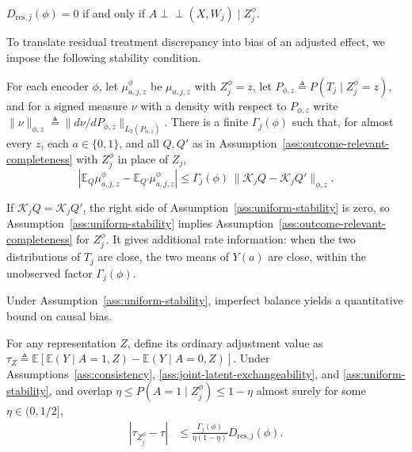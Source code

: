 \begin{proposition}
\label{prop:zero-discrepancy}
	$D_{\mathrm{res},j}(\phi)=0$ if and only if $A\perp\!\!\!\perp(X,W_j)\mid Z_j^\phi$.
\end{proposition}

To translate residual treatment discrepancy into bias of an adjusted effect, we impose the following stability condition.
\begin{assumption}
\label{ass:uniform-stability}
For each encoder $\phi$, let $\mu^\phi_{a,j,z}$ be $\mu_{a,j,z}$ with $Z_j^\phi = z$, let $P_{\phi,z}\triangleq P(T_j\mid Z_j^\phi=z)$, and for a signed measure $\nu$ with a density with respect to $P_{\phi,z}$ write $\|\nu\|_{\phi,z}\triangleq\|d\nu/dP_{\phi,z}\|_{L_2(P_{\phi,z})}$. There is a finite $\Gamma_j(\phi)$ such that, for almost every $z$, each $a\in\{0,1\}$, and all $Q,Q'$ as in Assumption~\ref{ass:outcome-relevant-completeness} with $Z_j^\phi$ in place of $Z_j$,
\[|\mathbb E_Q\mu^\phi_{a,j,z}-\mathbb E_{Q'}\mu^\phi_{a,j,z}|\le\Gamma_j(\phi)\,\|\mathcal K_jQ-\mathcal K_jQ'\|_{\phi,z}.\]
\end{assumption}
 If $\mathcal K_jQ=\mathcal K_jQ'$, the right side of Assumption~\ref{ass:uniform-stability} is zero, so Assumption~\ref{ass:uniform-stability} implies Assumption~\ref{ass:outcome-relevant-completeness} for $Z_j^\phi$. It gives additional rate information: when the two distributions of $T_j$ are close, the two means of $Y(a)$ are close, within the unobserved factor $\Gamma_j(\phi)$.

Under Assumption~\ref{ass:uniform-stability}, imperfect balance yields a quantitative bound on causal bias.

\begin{theorem}
\label{thm:approximate-proxy-bias-bound}
For any representation $Z$, define its ordinary adjustment value as $\tau_Z\triangleq\mathbb E[\mathbb E(Y\mid A=1,Z)-\mathbb E(Y\mid A=0,Z)]$.
Under Assumptions~\ref{ass:consistency}, \ref{ass:joint-latent-exchangeability}, and \ref{ass:uniform-stability}, and overlap $\eta\le P(A=1\mid Z_j^\phi)\le1-\eta$ almost surely for some $\eta\in(0,1/2]$,
\begin{align}
|\tau_{Z_j^\phi}-\tau| &\le\frac{\Gamma_j(\phi)}{\eta(1-\eta)}D_{\mathrm{res},j}(\phi).
\label{eq:uniform-approximate-proxy-bias-bound}
\end{align}
\end{theorem}


